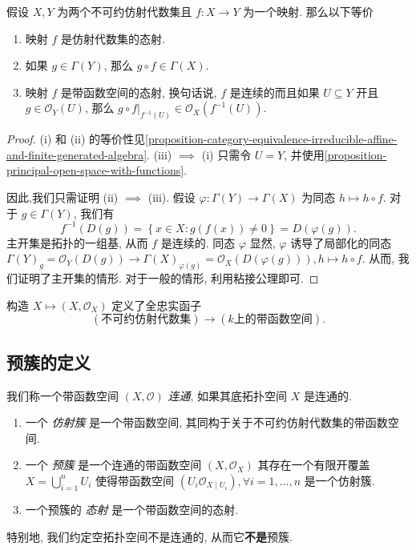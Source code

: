 \begin{proposition}
  假设 \( X, Y \) 为两个不可约仿射代数集且 \( f: X \to Y \) 为一个映射.
  那么以下等价
  \begin{enumerate}
    \item 映射 \( f \) 是仿射代数集的态射.
    \item 如果 \( g \in \Gamma(Y) \), 那么 \( g \circ f \in \Gamma(X) \).
    \item 映射 \( f \) 是带函数空间的态射, 换句话说, \( f \) 是连续的而且如果 \(
      U \subseteq Y \) 开且 \( g \in \mathscr{O}_Y(U) \), 那么 \(
      \left. g \circ f \right\vert_{f^{-1}(U)} \in \mathscr{O}_X(f^{-1}(U)) \).
  \end{enumerate}
\end{proposition}
\begin{proof}
  (i) 和 (ii)
  的等价性见\cref{proposition-category-equivalence-irreducible-affine-and-finite-generated-algebra}.
  (iii) \( \implies \) (i) 只需令 \( U = Y \),
  并使用\cref{proposition-principal-open-space-with-functions}. 

  因此,我们只需证明 (ii) \( \implies \) (iii). 假设 \( \varphi: \Gamma(Y) \to
  \Gamma(X) \) 为同态 \( h \mapsto h \circ f \). 对于 \( g \in \Gamma(Y) \),
  我们有
  \[
    f^{-1}(D(g)) = \left\lbrace x \in X: g(f(x)) \neq 0 \right\rbrace =
    D(\varphi(g)).
  \]
  主开集是拓扑的一组基, 从而 \( f \) 是连续的. 同态 \( \varphi \)
  显然, \( \varphi \) 诱导了局部化的同态 \( \Gamma(Y)_g = \mathscr{O}_Y(D(g)) \to
  \Gamma(X)_{\varphi(g)} = \mathscr{O}_X(D(\varphi(g))), h \mapsto h \circ f \).
  从而, 我们证明了主开集的情形. 对于一般的情形, 利用粘接公理即可.
\end{proof}

\begin{theorem}
  构造 \( X \mapsto (X, \mathscr{O}_X) \) 定义了全忠实函子
  \[
    \left( \text{不可约仿射代数集} \right)  \to  \left( k \text{上的带函数空间}
    \right).
  \]
\end{theorem}

\subsection{预簇的定义}

我们称一个带函数空间 \( (X, \mathscr{O}) \) \emph{连通}, 如果其底拓扑空间 \( X
\) 是连通的.

\begin{enumerate}
  \item 一个 \emph{仿射簇} 是一个带函数空间,
    其同构于关于不可约仿射代数集的带函数空间.
  \item 一个 \emph{预簇} 是一个连通的带函数空间 \( (X, \mathscr{O}_X) \)
    其存在一个有限开覆盖 \( X = \bigcup_{i = 1}^n U_i \) 使得带函数空间 \( (U_i
    \mathscr{O}_{X \mid U_i}), \forall i = 1, \ldots, n \) 是一个仿射簇.
  \item 一个预簇的 \emph{态射} 是一个带函数空间的态射.
\end{enumerate}
特别地, 我们约定空拓扑空间不是连通的, 从而它\textbf{不是}预簇.

